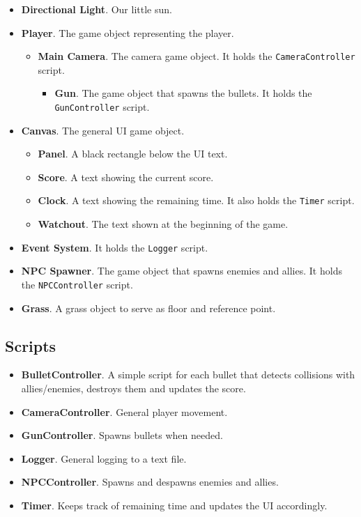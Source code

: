 \documentclass[
	emulatestandardclasses, %
	11pt,
	a4paper,
	toc=bib, %
	parskip=half-,
	numbers=endperiod,
]{scrartcl}
\begin{document}
\begin{itemize}
	\item \textbf{Directional Light}. Our little sun.
	\item \textbf{Player}. The game object representing the player.
	\begin{itemize}
		\item \textbf{Main Camera}. The camera game object. It holds the \texttt{CameraController} script.
		\begin{itemize}
			\item \textbf{Gun}. The game object that spawns the bullets. It holds the \texttt{GunController} script.
		\end{itemize}
	\end{itemize}
	\item \textbf{Canvas}. The general UI game object.
	\begin{itemize}
		\item \textbf{Panel}. A black rectangle below the UI text.
		\item \textbf{Score}. A text showing the current score.
		\item \textbf{Clock}. A text showing the remaining time. It also holds the \texttt{Timer} script.
		\item \textbf{Watchout}. The text shown at the beginning of the game.
	\end{itemize}
	\item \textbf{Event System}. It holds the \texttt{Logger} script.
	\item \textbf{NPC Spawner}. The game object that spawns enemies and allies. It holds the \texttt{NPCController} script.
	\item \textbf{Grass}. A grass object to serve as floor and reference point.
\end{itemize}

\subsection{Scripts}

\begin{itemize}
	\item \textbf{BulletController}. A simple script for each bullet that detects collisions with allies/enemies, destroys them and updates the score.
	\item \textbf{CameraController}. General player movement.
	\item \textbf{GunController}. Spawns bullets when needed.
	\item \textbf{Logger}. General logging to a text file.
	\item \textbf{NPCController}. Spawns and despawns enemies and allies.
	\item \textbf{Timer}. Keeps track of remaining time and updates the UI accordingly.
\end{itemize}
\end{document}
